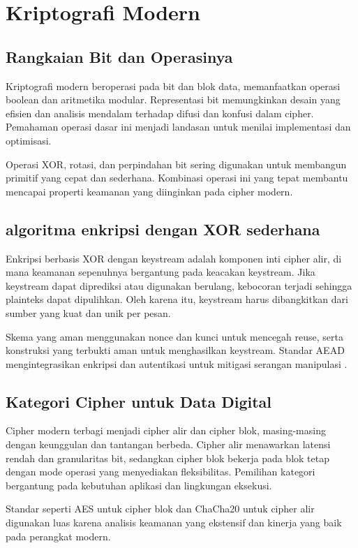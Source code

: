 \documentclass[../main.tex]{subfiles}
\begin{document}
\chapter{Kriptografi Modern}

\section{Rangkaian Bit dan Operasinya}
Kriptografi modern beroperasi pada bit dan blok data, memanfaatkan operasi boolean dan aritmetika modular. Representasi bit memungkinkan desain yang efisien dan analisis mendalam terhadap difusi dan konfusi dalam cipher. Pemahaman operasi dasar ini menjadi landasan untuk menilai implementasi dan optimisasi.

Operasi XOR, rotasi, dan perpindahan bit sering digunakan untuk membangun primitif yang cepat dan sederhana. Kombinasi operasi ini yang tepat membantu mencapai properti keamanan yang diinginkan pada cipher modern.

\section{algoritma enkripsi dengan XOR sederhana}
Enkripsi berbasis XOR dengan keystream adalah komponen inti cipher alir, di mana keamanan sepenuhnya bergantung pada keacakan keystream. Jika keystream dapat diprediksi atau digunakan berulang, kebocoran terjadi sehingga plainteks dapat dipulihkan. Oleh karena itu, keystream harus dibangkitkan dari sumber yang kuat dan unik per pesan.

Skema yang aman menggunakan nonce dan kunci untuk mencegah reuse, serta konstruksi yang terbukti aman untuk menghasilkan keystream. Standar AEAD mengintegrasikan enkripsi dan autentikasi untuk mitigasi serangan manipulasi \parencite{rfc5116}.

\section{Kategori Cipher untuk Data Digital}
Cipher modern terbagi menjadi cipher alir dan cipher blok, masing-masing dengan keunggulan dan tantangan berbeda. Cipher alir menawarkan latensi rendah dan granularitas bit, sedangkan cipher blok bekerja pada blok tetap dengan mode operasi yang menyediakan fleksibilitas. Pemilihan kategori bergantung pada kebutuhan aplikasi dan lingkungan eksekusi.

Standar seperti AES untuk cipher blok dan ChaCha20 untuk cipher alir digunakan luas karena analisis keamanan yang ekstensif dan kinerja yang baik pada perangkat modern.
\end{document}
